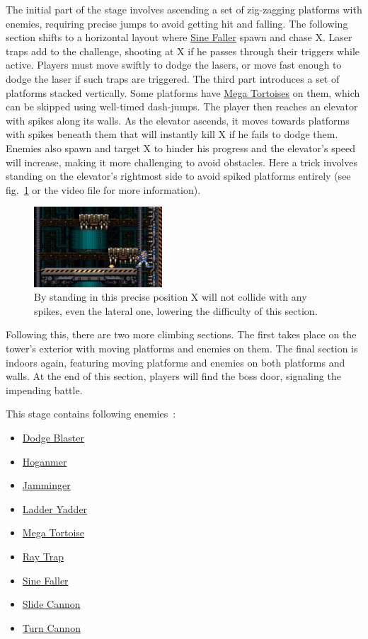 The initial part of the stage involves ascending a set of zig-zagging platforms with enemies, requiring precise jumps to avoid getting hit and falling. The following section shifts to a horizontal layout where \hyperlink{enem:Sine_Faller}{Sine Faller} spawn and chase X. Laser traps add to the challenge, shooting at X if he passes through their triggers while active. Players must move swiftly to dodge the lasers, or move fast enough to dodge the laser if such traps are triggered. The third part introduces a set of platforms stacked vertically. Some platforms have \hyperlink{enem:Mega_Tortoise}{Mega Tortoises} on them, which can be skipped using well-timed dash-jumps. The player then reaches an elevator with spikes along its walls. As the elevator ascends, it moves towards platforms with spikes beneath them that will instantly kill X if he fails to dodge them. Enemies also spawn and target X to hinder his progress and the elevator's speed  will increase, making it more challenging to avoid obstacles. Here a  trick involves standing on the elevator's rightmost side to avoid spiked platforms entirely (see fig.~\ref{tower_spike} or the video file  for more information).
\begin{figure}[htp]
	\centering
	\includegraphics[height=3cm]{figures/X1/Boomer_kuwanger/Tower_spike_skip.jpg}
	\caption{By standing in this precise position X will not collide with any spikes, even the lateral one, lowering the difficulty of this section.}
	\label{tower_spike}
\end{figure}
Following this, there are two more climbing sections. The first takes place on the tower's exterior with moving platforms and enemies on them. The final section is indoors again, featuring moving platforms and enemies on both platforms and walls. At the end of this section, players will find the boss door, signaling the impending battle.

This stage contains following enemies~\cite{wiki:Tower}:

\begin{itemize}
	\item \hyperlink{enem:Dodge_Blaster}{Dodge Blaster}
	\item \hyperlink{enem:Hoganmer}{Hoganmer}
	\item \hyperlink{enem:Jamminger}{Jamminger}
	\item \hyperlink{enem:Ladder_Yadder}{Ladder Yadder}
	\item \hyperlink{enem:Mega_Tortoise}{Mega Tortoise}
	\item \hyperlink {enem:Ray_Trap}{Ray Trap}
	\item \hyperlink{enem:Sine_Faller}{Sine Faller}
	\item \hyperlink{enem:Slide_Cannon}{Slide Cannon}
	\item \hyperlink{enem:Turn_Cannon}{Turn Cannon}
\end{itemize}

